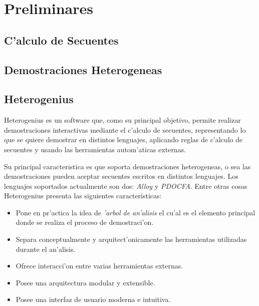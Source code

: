 \chapter{Preliminares}

\section{C'alculo de Secuentes}


\section{Demostraciones Heterogeneas}


\section{Heterogenius}

Heterogenius \cite{heterogenius} es un software que, como su principal objetivo, permite realizar demostraciones interactivas mediante el c'alculo de secuentes, representando lo que se quiere demostrar en distintos lenguajes, aplicando reglas de c'alculo de secuentes y usando las herramientas autom'aticas externas. 

Su principal caracteristica es que soporta demostraciones heterogeneas, o sea las demostraciones pueden aceptar secuentes escritos en distintos lenguajes. Los lenguajes soportados actualmente son dos: \textit{Alloy} y \textit{PDOCFA}. Entre otras cosas Heterogenius presenta las siguientes caracteristicas:

\begin{itemize}

\item Pone en pr'actica la idea de \textit{'arbol de an'alisis} el cu'al es el elemento principal donde se realiza el proceso de demostraci'on.

\item Separa conceptualmente y arquitect'onicamente las herramientas utilizadas durante el an'alisis.

\item Ofrece interacci'on entre varias herramientas externas.

\item Posee una arquitectura modular y extensible.

\item Posee una interfaz de usuario moderna e intuitiva.

\end{itemize}

